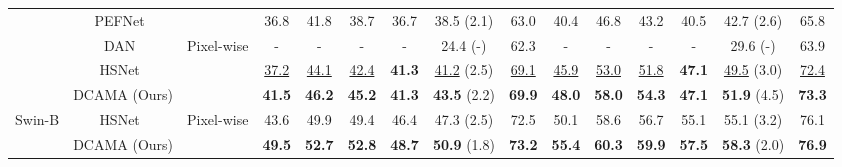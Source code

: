 \documentclass[runningheads,table,xcdraw]{llncs}
\begin{document}
\begin{table*}[t]
{\begin{tabular}{ccccccccccccccc}
\multicolumn{1}{c|}{}                            & \multicolumn{1}{c|}{PEFNet~\cite{tian2020prior}}                    & \multicolumn{1}{c|}{}                            & 36.8          & 41.8          & 38.7          & \multicolumn{1}{c|}{36.7}          & \multicolumn{1}{c|}{38.5 (2.1)}          & \multicolumn{1}{c|}{63.0}          & 40.4          & 46.8          & 43.2          & \multicolumn{1}{c|}{40.5}          & \multicolumn{1}{c|}{42.7 (2.6)}          & 65.8          \\ \cline{2-15}
\multicolumn{1}{c|}{}                            & \multicolumn{1}{c|}{DAN~\cite{wang2020few}}                         & \multicolumn{1}{c|}{\multirow{3}{*}{Pixel-wise}} & -             & -             & -             & \multicolumn{1}{c|}{-}             & \multicolumn{1}{c|}{24.4 (-)}            & \multicolumn{1}{c|}{62.3}          & -             & -             & -             & \multicolumn{1}{c|}{-}             & \multicolumn{1}{c|}{29.6 (-)}            & 63.9          \\
\multicolumn{1}{c|}{}                            & \multicolumn{1}{c|}{HSNet~\cite{min2021hypercorrelation}}           & \multicolumn{1}{c|}{}                            & \uline{37.2}  & \uline{44.1}  & \uline{42.4}  & \multicolumn{1}{c|}{\textbf{41.3}} & \multicolumn{1}{c|}{\uline{41.2} (2.5)}  & \multicolumn{1}{c|}{\uline{69.1}}  & \uline{45.9}  & \uline{53.0}  & \uline{51.8}  & \multicolumn{1}{c|}{\textbf{47.1}} & \multicolumn{1}{c|}{\uline{49.5} (3.0)}  & \uline{72.4}  \\
\multicolumn{1}{c|}{}                            & \multicolumn{1}{c|}{DCAMA (Ours)}                            & \multicolumn{1}{c|}{}                            & \textbf{41.5} & \textbf{46.2} & \textbf{45.2} & \multicolumn{1}{c|}{\textbf{41.3}} & \multicolumn{1}{c|}{\textbf{43.5} (2.2)} & \multicolumn{1}{c|}{\textbf{69.9}} & \textbf{48.0} & \textbf{58.0} & \textbf{54.3} & \multicolumn{1}{c|}{\textbf{47.1}} & \multicolumn{1}{c|}{\textbf{51.9} (4.5)} & \textbf{73.3} \\ \hline
\multicolumn{1}{c|}{\multirow{2}{*}{Swin-B}}     & \multicolumn{1}{c|}{HSNet~\cite{min2021hypercorrelation}} & \multicolumn{1}{c|}{\multirow{2}{*}{Pixel-wise}} & 43.6          & 49.9          & 49.4          & \multicolumn{1}{c|}{46.4}          & \multicolumn{1}{c|}{47.3 (2.5)}          & \multicolumn{1}{c|}{72.5}          & 50.1          & 58.6          & 56.7          & \multicolumn{1}{c|}{55.1}          & \multicolumn{1}{c|}{55.1 (3.2)}          & 76.1          \\
\multicolumn{1}{c|}{}                            & \multicolumn{1}{c|}{DCAMA (Ours)}                            & \multicolumn{1}{c|}{}                            & \textbf{49.5} & \textbf{52.7} & \textbf{52.8} & \multicolumn{1}{c|}{\textbf{48.7}} & \multicolumn{1}{c|}{\textbf{50.9} (1.8)} & \multicolumn{1}{c|}{\textbf{73.2}} & \textbf{55.4} & \textbf{60.3} & \textbf{59.9} & \multicolumn{1}{c|}{\textbf{57.5}} & \multicolumn{1}{c|}{\textbf{58.3} (2.0)} & \textbf{76.9} \\ \hline
\end{tabular}
  }\vspace{-3.6mm}
\end{table*}
\end{document}
